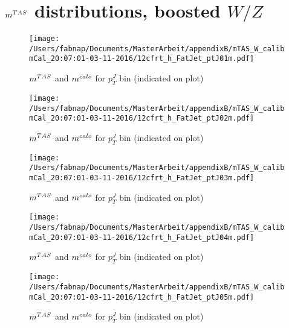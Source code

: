 \newpage
\clearpage
\vspace*{\fill}
\section{$m^{TAS}$ distributions, boosted $W/Z$}
\vfill
\clearpage
\twocolumn

\begin{figure}
 
\texttt{[image: /Users/fabnap/Documents/MasterArbeit/appendixB/mTAS\_W\_calibmCal\_20:07:01-03-11-2016/12cfrt\_h\_FatJet\_ptJ01m.pdf]}
\caption{$m^{TAS}$ and $m^{calo}$ for $p_{T}^{J}$ bin (indicated on plot) }
 
\end{figure}
 
\begin{figure}
 
\texttt{[image: /Users/fabnap/Documents/MasterArbeit/appendixB/mTAS\_W\_calibmCal\_20:07:01-03-11-2016/12cfrt\_h\_FatJet\_ptJ02m.pdf]}
\caption{$m^{TAS}$ and $m^{calo}$ for $p_{T}^{J}$ bin (indicated on plot) }
 
\end{figure}
 
\begin{figure}
 
\texttt{[image: /Users/fabnap/Documents/MasterArbeit/appendixB/mTAS\_W\_calibmCal\_20:07:01-03-11-2016/12cfrt\_h\_FatJet\_ptJ03m.pdf]}
\caption{$m^{TAS}$ and $m^{calo}$ for $p_{T}^{J}$ bin (indicated on plot) }
 
\end{figure}
 
\begin{figure}
 
\texttt{[image: /Users/fabnap/Documents/MasterArbeit/appendixB/mTAS\_W\_calibmCal\_20:07:01-03-11-2016/12cfrt\_h\_FatJet\_ptJ04m.pdf]}
\caption{$m^{TAS}$ and $m^{calo}$ for $p_{T}^{J}$ bin (indicated on plot) }
 
\end{figure}
 
\begin{figure}
 
\texttt{[image: /Users/fabnap/Documents/MasterArbeit/appendixB/mTAS\_W\_calibmCal\_20:07:01-03-11-2016/12cfrt\_h\_FatJet\_ptJ05m.pdf]}
\caption{$m^{TAS}$ and $m^{calo}$ for $p_{T}^{J}$ bin (indicated on plot) }
 
\end{figure}
 
